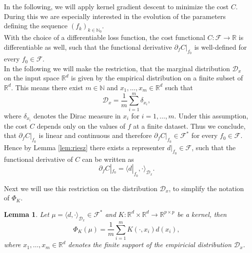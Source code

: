 \documentclass[11pt, a4paper]{article}
\newtheorem{lemma}[theorem]{Lemma}
\newcommand{\N}{\mathbb{N}}
\newcommand{\R}{\mathbb{R}}
\newcommand{\D}{\mathcal{D}}
\newcommand{\F}{\mathcal{F}}
\begin{document}
In the following, we will apply kernel gradient descent to minimize the cost $C$. During this we are especially interested in the evolution of the parameters defining the sequence $(f_k)_{k \in \N_0}$. \\

With the choice of a differentiable loss function, the cost functional $C : \F \to \R$ is differentiable as well, such that the functional derivative $\partial_{f} C |_{f_0}$ is well-defined for every $f_0 \in \F$. \\

In the following we will make the restriction, that the marginal distribution $\D_x$ on the input space $\R^d$ is given by the empirical distribution on a finite subset of $\R^d$. This means there exist $m \in \N$ and $x_1, \dots, x_m \in \R^d$ such that 
\[ \D_x = \frac{1}{m} \sum_{i=1}^{m} \delta_{x_i}, \]
where $\delta_{x_i}$ denotes the Dirac measure in $x_i$ for $i=1,\dots,m$. Under this assumption, the cost $C$ depends only on the values of $f$ at a finite dataset. Thus we conclude, that $\partial_{f} C |_{f_0}$ is linear and continuous and therefore $\partial_{f} C |_{f_0} \in \F^*$ for every $f_0 \in \F$. Hence by Lemma \ref{lem:riesz} there exists a representer $d|_{f_0} \in \F$, such that the functional derivative of $C$ can be written as
\[ \partial_{f} C |_{f_0} = \big \langle d|_{f_0}, \cdot \big \rangle_{\D_x}. \]

Next we will use this restriction on the distribution $\D_x$, to simplify the notation of $\Phi_K$.

\begin{lemma} \label{lem:phi}
Let $\mu = \langle d, \cdot \rangle_{\D_x} \in \F^*$ and $K: \R^d \times \R^d \to \R^{p \times p}$ be a kernel, then
\[ \Phi_K(\mu) = \frac{1}{m}\sum_{i=1}^{m} K(\cdot,x_i)d(x_i), \]
where $x_1, \dots, x_m \in \R^d$ denotes the finite support of the empiricial distribution $\D_x$.
\end{lemma}
\end{document}
